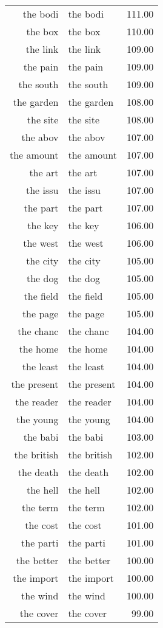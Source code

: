 \begin{table}[ht]
\begin{tabular}{rlr}
  the bodi & the bodi & 111.00 \\ 
  the box & the box & 110.00 \\ 
  the link & the link & 109.00 \\ 
  the pain & the pain & 109.00 \\ 
  the south & the south & 109.00 \\ 
  the garden & the garden & 108.00 \\ 
  the site & the site & 108.00 \\ 
  the abov & the abov & 107.00 \\ 
  the amount & the amount & 107.00 \\ 
  the art & the art & 107.00 \\ 
  the issu & the issu & 107.00 \\ 
  the part & the part & 107.00 \\ 
  the key & the key & 106.00 \\ 
  the west & the west & 106.00 \\ 
  the city & the city & 105.00 \\ 
  the dog & the dog & 105.00 \\ 
  the field & the field & 105.00 \\ 
  the page & the page & 105.00 \\ 
  the chanc & the chanc & 104.00 \\ 
  the home & the home & 104.00 \\ 
  the least & the least & 104.00 \\ 
  the present & the present & 104.00 \\ 
  the reader & the reader & 104.00 \\ 
  the young & the young & 104.00 \\ 
  the babi & the babi & 103.00 \\ 
  the british & the british & 102.00 \\ 
  the death & the death & 102.00 \\ 
  the hell & the hell & 102.00 \\ 
  the term & the term & 102.00 \\ 
  the cost & the cost & 101.00 \\ 
  the parti & the parti & 101.00 \\ 
  the better & the better & 100.00 \\ 
  the import & the import & 100.00 \\ 
  the wind & the wind & 100.00 \\ 
  the cover & the cover & 99.00 \\ 

\end{tabular}
\end{table}
